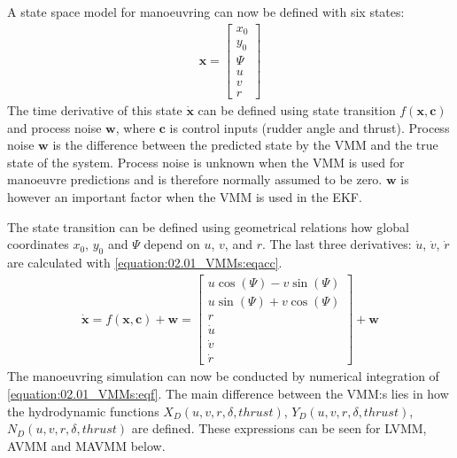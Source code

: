 \documentclass[review]{elsarticle}
\begin{document}
\sphinxAtStartPar
A state space model for manoeuvring can now be defined with six states:
\begin{equation}\label{equation:02.01_VMMs:eq_x}
\begin{split}\displaystyle \mathbf{x} = \left[\begin{matrix}x_{0}\\y_{0}\\\Psi\\u\\v\\r\end{matrix}\right]\end{split}
\end{equation}
\sphinxAtStartPar
The time derivative of this state \(\dot{\mathbf{x}}\) can be defined using state transition \(f(\mathbf{x},\mathbf{c})\) and process noise \(\mathbf{w}\), where \(\mathbf{c}\) is control inputs (rudder angle and thrust). Process noise \(\mathbf{w}\) is the difference between the predicted state by the VMM and the true state of the system. Process noise is unknown when the VMM is used for manoeuvre predictions and is therefore normally assumed to be zero. \(\mathbf{w}\) is however an important factor when the VMM is used in the EKF.

\sphinxAtStartPar
The state transition can be defined using geometrical relations how global coordinates \(x_0\), \(y_0\) and \(\Psi\) depend on \(u\), \(v\), and \(r\).
The last three derivatives: \(\dot{u}\), \(\dot{v}\), \(\dot{r}\) are calculated with \autoref{equation:02.01_VMMs:eqacc}.
\begin{equation}\label{equation:02.01_VMMs:eqf}
\begin{split}\displaystyle \dot{\mathbf{x}} = f(\mathbf{x},\mathbf{c}) + \mathbf{w} = \left[\begin{matrix}u \cos{\left(\Psi \right)} - v \sin{\left(\Psi \right)}\\u \sin{\left(\Psi \right)} + v \cos{\left(\Psi \right)}\\r\\\dot{u}\\\dot{v}\\\dot{r}\end{matrix}\right] + \mathbf{w}\end{split}
\end{equation}
\sphinxAtStartPar
The manoeuvring simulation can now be conducted by numerical integration of \autoref{equation:02.01_VMMs:eqf}. The main difference between the VMM:s lies in how the hydrodynamic functions \(X_D(u,v,r,\delta,thrust)\), \(Y_D(u,v,r,\delta,thrust)\), \(N_D(u,v,r,\delta,thrust)\) are defined. These expressions can be seen for LVMM, AVMM and MAVMM below.
\end{document}
